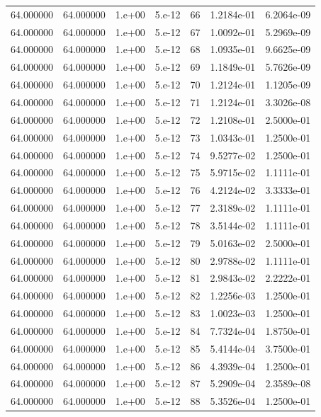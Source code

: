 \begin{table}[htbp]
\begin{tabular}{rrrrrrr}
64.000000 & 64.000000 & 1.e+00 & 5.e-12 & 66 & 1.2184e-01 & 6.2064e-09 \\
64.000000 & 64.000000 & 1.e+00 & 5.e-12 & 67 & 1.0092e-01 & 5.2969e-09 \\
64.000000 & 64.000000 & 1.e+00 & 5.e-12 & 68 & 1.0935e-01 & 9.6625e-09 \\
64.000000 & 64.000000 & 1.e+00 & 5.e-12 & 69 & 1.1849e-01 & 5.7626e-09 \\
64.000000 & 64.000000 & 1.e+00 & 5.e-12 & 70 & 1.2124e-01 & 1.1205e-09 \\
64.000000 & 64.000000 & 1.e+00 & 5.e-12 & 71 & 1.2124e-01 & 3.3026e-08 \\
64.000000 & 64.000000 & 1.e+00 & 5.e-12 & 72 & 1.2108e-01 & 2.5000e-01 \\
64.000000 & 64.000000 & 1.e+00 & 5.e-12 & 73 & 1.0343e-01 & 1.2500e-01 \\
64.000000 & 64.000000 & 1.e+00 & 5.e-12 & 74 & 9.5277e-02 & 1.2500e-01 \\
64.000000 & 64.000000 & 1.e+00 & 5.e-12 & 75 & 5.9715e-02 & 1.1111e-01 \\
64.000000 & 64.000000 & 1.e+00 & 5.e-12 & 76 & 4.2124e-02 & 3.3333e-01 \\
64.000000 & 64.000000 & 1.e+00 & 5.e-12 & 77 & 2.3189e-02 & 1.1111e-01 \\
64.000000 & 64.000000 & 1.e+00 & 5.e-12 & 78 & 3.5144e-02 & 1.1111e-01 \\
64.000000 & 64.000000 & 1.e+00 & 5.e-12 & 79 & 5.0163e-02 & 2.5000e-01 \\
64.000000 & 64.000000 & 1.e+00 & 5.e-12 & 80 & 2.9788e-02 & 1.1111e-01 \\
64.000000 & 64.000000 & 1.e+00 & 5.e-12 & 81 & 2.9843e-02 & 2.2222e-01 \\
64.000000 & 64.000000 & 1.e+00 & 5.e-12 & 82 & 1.2256e-03 & 1.2500e-01 \\
64.000000 & 64.000000 & 1.e+00 & 5.e-12 & 83 & 1.0023e-03 & 1.2500e-01 \\
64.000000 & 64.000000 & 1.e+00 & 5.e-12 & 84 & 7.7324e-04 & 1.8750e-01 \\
64.000000 & 64.000000 & 1.e+00 & 5.e-12 & 85 & 5.4144e-04 & 3.7500e-01 \\
64.000000 & 64.000000 & 1.e+00 & 5.e-12 & 86 & 4.3939e-04 & 1.2500e-01 \\
64.000000 & 64.000000 & 1.e+00 & 5.e-12 & 87 & 5.2909e-04 & 2.3589e-08 \\
64.000000 & 64.000000 & 1.e+00 & 5.e-12 & 88 & 5.3526e-04 & 1.2500e-01 \\

\end{tabular}
\end{table}
